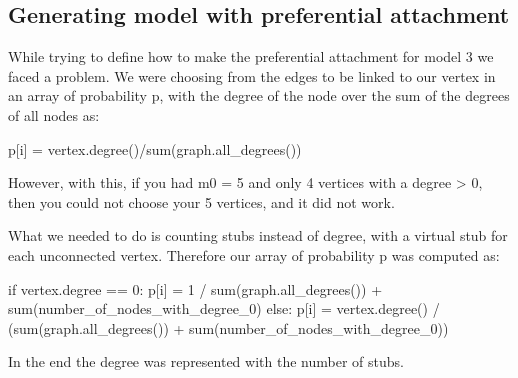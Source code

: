 \documentclass{article}
\begin{document}
\subsection{Generating model with preferential attachment}

While trying to define how to make the preferential attachment for model 3 we
faced a problem. We were choosing from the edges to be linked to our vertex in
an array of probability p, with the degree of the node over the sum of the
degrees of all nodes as:

\begin{python}
    p[i] = vertex.degree()/sum(graph.all_degrees())
\end{python}

However, with this, if you had m0 = 5 and only 4 vertices with a degree > 0,
then you could not choose your 5 vertices, and it did not work.

What we needed to do is counting stubs instead of degree, with a virtual stub
for each unconnected vertex. Therefore our array of probability p was computed
as:

\begin{python}
if vertex.degree == 0:
    p[i] = 1 / sum(graph.all_degrees()) + sum(number_of_nodes_with_degree_0)
else:
    p[i] = vertex.degree() / (sum(graph.all_degrees()) + sum(number_of_nodes_with_degree_0))
\end{python}

In the end the degree was represented with the number of stubs.
\end{document}
